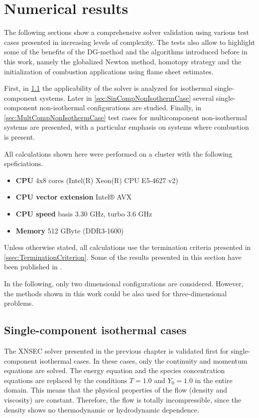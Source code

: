 \chapter{Numerical results}	\label{ch:results}
The following sections show a comprehensive solver validation using various test cases presented in increasing levels of complexity. The tests also allow to highlight some of the benefits of the DG-method and the algorithms introduced before in this work, namely the globalized Newton method, homotopy strategy and the initialization of combustion applications using flame sheet estimates. 

First, in \cref{sec:SingleCompIsotCase} the applicability of the solver is analyzed for isothermal single-component systems. Later in \cref{sec:SinCompNonIsothermCase} several single-component non-isothermal configurations are studied. Finally, in \cref{sec:MultCompNonIsothermCase} test cases for multicomponent non-isothermal systems are presented, with a particular emphasis on systems where combustion is present.

All calculations shown here were performed on a cluster with the following speficiations.
\begin{itemize}
    \item \textbf{CPU} 4x8 cores (Intel(R) Xeon(R) CPU E5-4627 v2)
    \item \textbf{CPU vector extension} Intel® AVX
    \item \textbf{CPU speed} basis 3.30 GHz, turbo 3.6 GHz
    \item \textbf{Memory} 512 GByte (DDR3-1600)
\end{itemize}
Unless otherwise stated, all calculations use the termination criteria presented in \cref{ssec:TerminationCriterion}.
Some of the results presented in this section have been published in \parencite{gutierrez-jorqueraFullyCoupledHighorder2022}.

In the following, only two dimensional configurations are considered. However, the methods shown in this work could be also used for three-dimensional problems. 
\section{Single-component isothermal cases}\label{sec:SingleCompIsotCase}
The XNSEC solver presented in the previous chapter is validated first for single-component isothermal cases. In these cases, only the continuity and momentum equations are solved. The energy equation and the species concentration equations are replaced by the conditions $T = 1.0$ and $Y_0 = 1.0$ in the entire domain. This means that the physical properties of the flow (density and viscosity) are constant. Therefore, the flow is totally incompressible, since the density shows no thermodynamic or hydrodynamic dependence.



